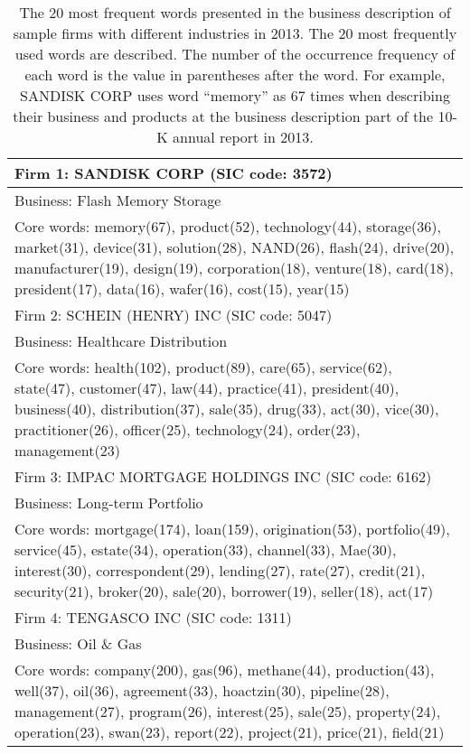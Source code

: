 \documentclass[11pt]{article}
\title{}
\author{}
\date{}
\begin{document}

\clearpage
\begin{table}
\linespread{1.2}
\caption{The 20 most frequent words presented in the business description of sample firms with different industries in 2013. The 20 most frequently used words are described. The number of the occurrence frequency of each word is the value in parentheses after the word. For example, SANDISK CORP uses word ``memory'' as 67 times when describing their business and products at the business description part of the 10-K annual report in 2013.}
\centering
\fontsize{10}{13}\selectfont
\begin{threeparttable}
\begin{tabu} to 
\\
\toprule
Firm 1: SANDISK CORP (SIC code: 3572) \\
\midrule 
Business: Flash Memory Storage\\[0.5ex]
Core words: memory(67), product(52), technology(44), storage(36), market(31), device(31), solution(28), NAND(26), flash(24), drive(20), manufacturer(19), design(19), corporation(18), venture(18), card(18), president(17), data(16), wafer(16), cost(15), year(15) \\
\midrule
Firm 2: SCHEIN (HENRY) INC (SIC code: 5047) \\
\midrule 
Business: Healthcare Distribution\\[0.5ex]
Core words: health(102), product(89), care(65), service(62), state(47), customer(47), law(44), practice(41), president(40), business(40), distribution(37), sale(35), drug(33), act(30), vice(30), practitioner(26), officer(25), technology(24), order(23), management(23) \\
\midrule
Firm 3: IMPAC MORTGAGE HOLDINGS INC (SIC code: 6162) \\
\midrule 
Business: Long-term Portfolio \\[0.5ex]
Core words: mortgage(174), loan(159), origination(53), portfolio(49), service(45), estate(34), operation(33), channel(33), Mae(30), interest(30), correspondent(29), lending(27), rate(27), credit(21), security(21), broker(20), sale(20), borrower(19), seller(18), act(17) \\
\midrule
Firm 4: TENGASCO INC (SIC code: 1311) \\
\midrule 
Business: Oil \& Gas \\[0.5ex]
Core words: company(200), gas(96), methane(44), production(43), well(37), oil(36), agreement(33), hoactzin(30), pipeline(28), management(27), program(26), interest(25), sale(25), property(24), operation(23), swan(23), report(22), project(21), price(21), field(21) \\

\end{tabu}
\end{threeparttable}
\end{table}
\end{document}
